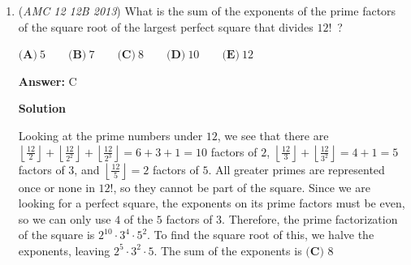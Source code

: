 \begin{enumerate}
We know lines $l_1$ and $l_2$ intersect at $B$, so we can solve for that point:
 \[3x-2y=1\]Because $y = 1$ we have: 
 \[3x-2(1) = 1\]
 \[3x-2=1\]
 \[3x=3\]
 \[x = 1\]

 Thus we have $B = (1,1)$. 

 We know that the area of the triangle is $3$, so by Shoelace Theorem we have: 

 
 \[A = \dfrac{1}{2} |(-2x+y-1) - (-2+x-y)|\]
 \[A = \dfrac{1}{2} |-2x+y-1+2-x+y|\]
 \[3 = \dfrac{1}{2} |-2x+y-1+2-x+y|\]
 \[6 = |-3x+2y+1|.\]

 Thus we have two options: 

 
 \[6 = -3x+2y+1\]
 \[5 = -3x+2y\]

 or

 
 \[6 = 3x-2y-1\]
 \[7 = 3x-2y.\]

 Now we must just find a point that satisfies $m_{l_3}$ is positive. 

 Since ${l_3}$ intersects ${l_2}$ at $y=1$, from the second equation: 

 
 \[7 = 3x-2(1)\]
 \[7+2 = 3x\]
 \[x=3\]

 so a valid point here is $(3,1)$. When calculated, the slope of $l_3$ in this situation yields $\boxed{\textbf{(B) }\frac{3}{4}}$.

 


	\item (\textit{AMC 12 12B 2013}) What is the sum of the exponents of the prime factors of the square root of the largest perfect square that divides $12!$ ?


 $\textbf{(A)}\ 5 \qquad \textbf{(B)}\ 7 \qquad \textbf{(C)}\ 8 \qquad \textbf{(D)}\ 10 \qquad \textbf{(E)}\ 12$

 \textbf{Answer: }C



\textbf{Solution}

Looking at the prime numbers under $12$, we see that there are $\left\lfloor\frac{12}{2}\right\rfloor+\left\lfloor\frac{12}{2^2}\right\rfloor+\left\lfloor\frac{12}{2^3}\right\rfloor=6+3+1=10$ factors of $2$, $\left\lfloor\frac{12}{3}\right\rfloor+\left\lfloor\frac{12}{3^2}\right\rfloor=4+1=5$ factors of $3$, and $\left\lfloor\frac{12}{5}\right\rfloor=2$ factors of $5$. All greater primes are represented once or none in $12!$, so they cannot be part of the square. Since we are looking for a perfect square, the exponents on its prime factors must be even, so we can only use $4$ of the $5$ factors of $3$. Therefore, the prime factorization of the square is $2^{10}\cdot3^4\cdot5^2$. To find the square root of this, we halve the exponents, leaving $2^5\cdot3^2\cdot5$. The sum of the exponents is $\boxed{\textbf{(C) }8}$




\end{enumerate}
